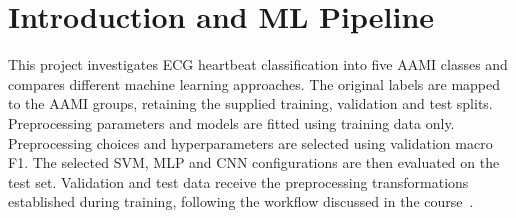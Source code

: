 \documentclass[11pt,oneside,a4paper]{article}
\begin{document}
    \section{Introduction and ML Pipeline}
    This project investigates ECG heartbeat classification into five
    AAMI classes and compares different machine learning approaches.
    The original labels are mapped to the AAMI groups, retaining the
    supplied training, validation and test splits. Preprocessing
    parameters and models are fitted using training data only.
    Preprocessing choices and hyperparameters are selected using
    validation macro F1. The selected SVM, MLP and CNN configurations are then evaluated
on the test set. Validation and test data
    receive the preprocessing transformations established during training,
    following the workflow discussed in the course~\cite{course_materials}.
\end{document}
